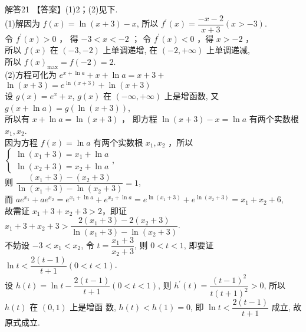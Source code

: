 \documentclass[11pt]{article}
\begin{document}
\heiti 解答21 \songti 【答案】(1)2；(2)见下.
\\(1)解因为 $f(x)=\ln (x+3)-x$, 所以 $f^{\prime}(x)=\dfrac{-x-2}{x+3}(x>-3)$.
\\令 $f^{\prime}(x)>0$ ， 得 $-3<x<-2$ ； 令 $f^{\prime}(x)<0$ ，得 $x>-2$ ，
\\所以 $f(x)$ 在 $(-3,-2)$ 上单调递增, 在 $(-2,+\infty)$ 上单调递减,
\\所以 $f(x)_{\max }=f(-2)=2$.
\\(2)方程可化为 $e^{x+\ln a}+x+\ln a=x+3+$ $\ln (x+3)=e^{\ln (x+3)}+\ln (x+3)$
\\设 $g(x)=e^{x}+x$,  $g(x)$ 在 $(-\infty,+\infty)$ 上是增函数, 又 $g(x+\ln a)=g(\ln (x+3))$,
\\所以有 $x+\ln a=\ln (x+3)$ ， 即方程 $\ln (x+3)-x=\ln a$ 有两个实数根 $x_{1},x_{2}$.
\\因为方程 $f(x)=\ln a$ 有两个实数根 $x_{1},x_{2}$ ，所以 $\left\{\begin{array}{l}\ln \left(x_{1}+3\right)=x_{1}+\ln a \\ \ln \left(x_{2}+3\right)=x_{2}+\ln a\end{array}\right.$, 
\\则
$\dfrac{\left(x_{1}+3\right)-\left(x_{2}+3\right)}{\ln \left(x_{1}+3\right)-\ln \left(x_{2}+3\right)}=1$, 
\\而
$a e^{x_{1}}+a e^{x_{2}}=e^{x_{1}+\ln a}+e^{x_{2}+\ln a}=e^{\ln \left(x_{1}+3\right)}+e^{\ln \left(x_{2}+3\right)}=x_{1}+x_{2}+6$, 
\\故需证 $x_{1}+3+x_{2}+3>2$，即证 $x_{1}+3+x_{2}+3>\dfrac{2\left(x_{1}+3\right)-2\left(x_{2}+3\right)}{\ln \left(x_{1}+3\right)-\ln \left(x_{2}+3\right)}$. 
\\不妨设 $-3<x_{1}<x_{2}$, 令 $t=\dfrac{x_{1}+3}{x_{2}+3}$, 则
$0<t<1$, 即要证 $\ln t<\dfrac{2(t-1)}{t+1}(0<t<1)$.
\\设 $h(t)=\ln t-\dfrac{2(t-1)}{t+1}(0<t<1)$, 则 $h^{\prime}(t)=\dfrac{(t-1)^{2}}{t(t+1)^{2}}>0$, 所以 $h(t)$ 在 $(0,1)$ 上是增函
数, $h(t)<h(1)=0$, 即 $\ln t<\dfrac{2(t-1)}{t+1}$ 成立, 故原式成立.
\end{document}
